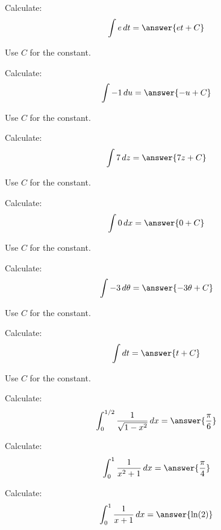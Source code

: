 \documentclass{ximera}
\begin{document}
\begin{problem} Calculate:
\[
\int e \d t = \answer{e t + C}
\]
\begin{hint}
  Use $C$ for the constant. 
\end{hint}
\end{problem}



\begin{problem} Calculate:
\[
\int -1 \d u = \answer{-u+C}
\]
\begin{hint}
  Use $C$ for the constant. 
\end{hint}
\end{problem}


\begin{problem} Calculate:
\[
\int 7 \d z = \answer{7z+C}
\]
\begin{hint}
  Use $C$ for the constant. 
\end{hint}
\end{problem}


\begin{problem} Calculate:
\[
\int 0 \d x = \answer{0+C}
\]
\begin{hint}
  Use $C$ for the constant. 
\end{hint}
\end{problem}

\begin{problem} Calculate:
\[
\int -3 \d \theta = \answer{-3\theta+C}
\]
\begin{hint}
  Use $C$ for the constant. 
\end{hint}
\end{problem}

\begin{problem} Calculate:
\[
\int  \d t = \answer{t+C}
\]
\begin{hint}
  Use $C$ for the constant. 
\end{hint}
\end{problem}



\begin{problem} Calculate:
\[
\int_0^{1/2} \frac{1}{\sqrt{1-x^2}} \d x =\answer{\frac{\pi }{6}}
\]
\end{problem}


\begin{problem} Calculate:
\[
\int_0^1 \frac{1}{x^2 + 1} \d x = \answer{\frac{\pi }{4}}
\]
\end{problem}



\begin{problem} Calculate:
\[
\int_0^1 \frac{1}{x + 1} \d x = \answer{\ln(2)}
\]
\end{problem}
\end{document}
